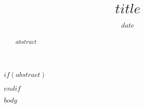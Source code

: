 \documentclass{article}
\title{$title$\vspace{-2em}}
\author{}
\date{$date$}
\begin{document}
\maketitle

$if(abstract)$
\vspace{-2em} %
\begin{center}
\begin{minipage}{0.8\textwidth} %
\begin{abstract}
$abstract$
\end{abstract}
\end{minipage}
\end{center}
\vspace{1em} %
$endif$

\begin{multicols}{2}
$body$
\end{multicols}
\end{document}

